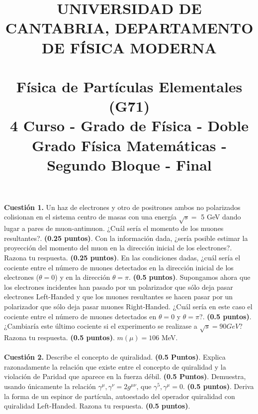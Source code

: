 \documentclass[paper=a4, fontsize=11pt]{scrartcl} %
\date{}
\title{	
\normalfont \normalsize 
\textsc{UNIVERSIDAD DE CANTABRIA, DEPARTAMENTO DE FÍSICA MODERNA} \\ [20pt] %
\horrule{0.5pt} \\[0.4cm] %
\huge Física de Partículas Elementales (G71) \\ %
\normalsize 4 Curso - Grado de Física - Doble Grado Física Matemáticas - Segundo Bloque - Final
\horrule{2pt} \\[0.5cm] %
}
\numberwithin{equation}{section} %
\numberwithin{figure}{section} %
\numberwithin{table}{section} %
\begin{document}
\maketitle %

\vspace{-2.5cm}

\textbf{Cuestión 1.} Un haz de electrones y otro de positrones ambos no polarizados colisionan en el sistema centro de masas con una energía $\sqrt{s}=$ 5 GeV dando lugar a 
pares de muon-antimuon. ¿Cuál sería el momento de los muones resultantes?. \textbf{(0.25 puntos)}. Con la información dada, ¿sería posible estimar la proyección 
del momento del muon en la dirección inicial de los electrones?. Razona tu respuesta. \textbf{(0.25 puntos)}. En las condiciones dadas, ¿cuál sería el cociente
entre el número de muones detectados en la dirección inicial de los electrones ($\theta=0$) y en la dirección $\theta=\pi$. \textbf{(0.5 puntos)}. Supongamos ahora
que los electrones incidentes han pasado por un polarizador que sólo deja pasar electrones Left-Handed y que los muones resultantes se hacen pasar por un polarizador
que sólo deja pasar muones Right-Handed. ¿Cuál sería en este caso el cociente entre el número de muones detectados en $\theta=0$ y $\theta=\pi$?. \textbf{(0.5 puntos)}.
¿Cambiaría este último cociente si el experimento se realizase a $\sqrt{s}=90 GeV$? Razona tu respuesta. \textbf{(0.5 puntos)}. $m(\mu)=106$ MeV.
\\
\\
\textbf{Cuestión 2.} Describe el concepto de quiralidad. \textbf{(0.5 Puntos)}. Explica razonadamente la relación que existe entre el concepto de quiralidad y 
la violación de Paridad que aparece en la fuerza débil. \textbf{(0.5 Puntos)}. Demuestra, usando únicamente la relación ${\gamma^\mu, \gamma^\nu}=2g^{\mu\nu}$, que
${\gamma^5, \gamma^\mu} = 0$. \textbf{(0.5 puntos)}. Deriva la forma de un espinor de partícula, autoestado del operador quiralidad con quiralidad Left-Handed. Razona
tu respuesta. \textbf{(0.5 puntos)}.  
\\
\\
\end{document}
